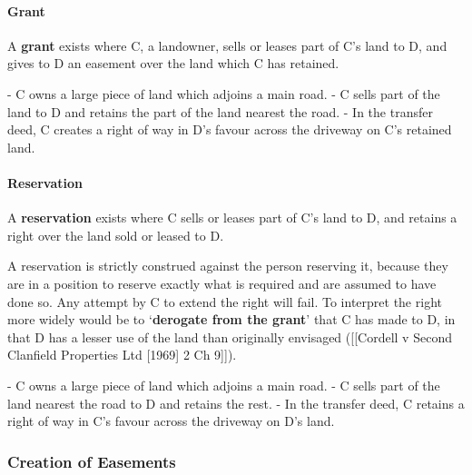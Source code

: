 \documentclass[
]{article}
\newenvironment{Shaded}{}{}
\newcommand{\NormalTok}[1]{#1}
\begin{document}
\hypertarget{grant}{%
\paragraph{Grant}\label{grant}}

A \textbf{grant} exists where C, a landowner, sells or leases part of
C's land to D, and gives to D an easement over the land which C has
retained.

\begin{Shaded}
\begin{Highlighting}[]
\NormalTok{{-} C owns a large piece of land which adjoins a main road.}
\NormalTok{{-} C sells part of the land to D and retains the part of the land nearest the road.}
\NormalTok{{-} In the transfer deed, C creates a right of way in D’s favour across the driveway on C’s retained land.}
\end{Highlighting}
\end{Shaded}

\hypertarget{reservation}{%
\paragraph{Reservation}\label{reservation}}

A \textbf{reservation} exists where C sells or leases part of C's land
to D, and retains a right over the land sold or leased to D.

A reservation is strictly construed against the person reserving it,
because they are in a position to reserve exactly what is required and
are assumed to have done so. Any attempt by C to extend the right will
fail. To interpret the right more widely would be to `\textbf{derogate
from the grant}' that C has made to D, in that D has a lesser use of the
land than originally envisaged ({[}{[}Cordell v Second Clanfield
Properties Ltd {[}1969{]} 2 Ch 9{]}{]}).

\begin{Shaded}
\begin{Highlighting}[]
\NormalTok{{-} C owns a large piece of land which adjoins a main road.}
\NormalTok{{-} C sells part of the land nearest the road to D and retains the rest.}
\NormalTok{{-} In the transfer deed, C retains a right of way in C’s favour across the driveway on D’s land.}
\end{Highlighting}
\end{Shaded}

\hypertarget{creation-of-easements}{%
\subsubsection{Creation of Easements}\label{creation-of-easements}}
\end{document}

